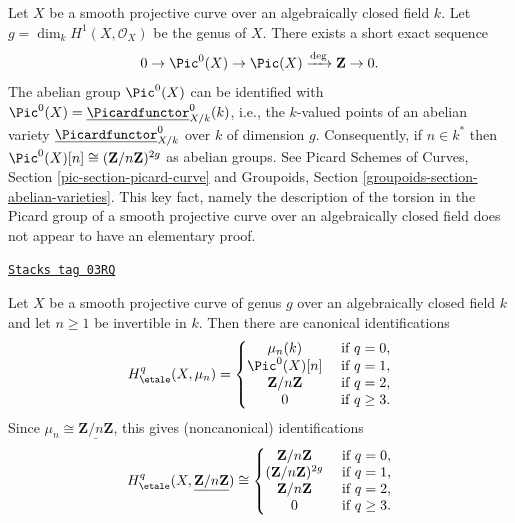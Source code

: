 \medskip\noindent
Let $X$ be a smooth projective curve over an algebraically closed field $k$.
Let $g = \dim_k H^1(X, \mathcal{O}_X)$ be the genus of $X$.
There exists a short exact sequence
$$
0 \to \Pic^0(X) \to \Pic(X) \xrightarrow{\deg} \mathbf{Z} \to 0.
$$
The abelian group $\Pic^0(X)$ can be identified with
$\Pic^0(X) = \underline{\Picardfunctor}^0_{X/k}(k)$, i.e.,
the $k$-valued points of an abelian variety
$\underline{\Picardfunctor}^0_{X/k}$ over $k$ of dimension $g$.
Consequently, if $n \in k^*$ then
$\Pic^0(X)[n] \cong (\mathbf{Z}/n\mathbf{Z})^{2g}$
as abelian groups. See
Picard Schemes of Curves, Section \ref{pic-section-picard-curve}
and
Groupoids, Section \ref{groupoids-section-abelian-varieties}.
This key fact, namely the description of the torsion in the
Picard group of a smooth projective curve over an algebraically
closed field does not appear to have an elementary proof.

\begin{lemma}
\label{etale-cohomology-lemma-cohomology-smooth-projective-curve}
\href{https://stacks.math.columbia.edu/tag/03RQ}{\texttt{Stacks tag 03RQ}}

Let $X$ be a smooth projective curve of genus $g$ over an
algebraically closed field $k$ and let $n \geq 1$ be invertible in $k$.
Then there are canonical identifications
$$
H_\etale^q(X, \mu_n) =
\left\{
\begin{matrix}
\mu_n(k) & \text{ if }q = 0, \\
\Pic^0(X)[n] & \text{ if }q = 1, \\
\mathbf{Z}/n\mathbf{Z} & \text{ if }q = 2, \\
0 & \text{ if }q \geq 3.
\end{matrix}
\right.
$$
Since $\mu_n \cong \underline{\mathbf{Z}/n\mathbf{Z}}$, this gives
(noncanonical) identifications
$$
H_\etale^q(X, \underline{\mathbf{Z}/n\mathbf{Z}}) \cong
\left\{
\begin{matrix}
\mathbf{Z}/n\mathbf{Z} & \text{ if }q = 0, \\
(\mathbf{Z}/n\mathbf{Z})^{2g} & \text{ if }q = 1, \\
\mathbf{Z}/n\mathbf{Z} & \text{ if }q = 2, \\
0 & \text{ if }q \geq 3.
\end{matrix}
\right.
$$
\end{lemma}

